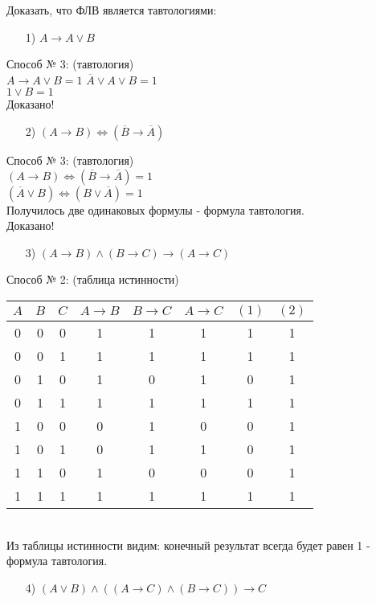 \documentclass{article}
\begin{document}
Доказать, что ФЛВ является тавтологиями:
\begin{enumerate}
\item[1)] $A \rightarrow A \vee B$
\end{enumerate}
Способ № 3: (тавтология)\\
$A \rightarrow A \vee B = 1$
$\overline{A} \vee A \vee B = 1$\\
$1 \vee B = 1$\\
Доказано!
\begin{enumerate}
\item[2)] $(A \rightarrow B) \Longleftrightarrow (\overline{B} \rightarrow \overline{A}) $
\end{enumerate}
Способ № 3: (тавтология)\\
$(A \rightarrow B) \Longleftrightarrow (\overline{B} \rightarrow \overline{A}) = 1$\\
$(\overline{A} \vee B) \Longleftrightarrow (B \vee \overline{A}) = 1$\\
Получилось две одинаковых формулы - формула тавтология.\\
Доказано!
\begin{enumerate}
\item[3)] $(A \rightarrow B) \wedge (B \rightarrow C) \rightarrow (A \rightarrow C)$
\end{enumerate}
Способ № 2: (таблица истинности)\\
\begin{tabular}{ | c | c | c | c | c | c | c| c | } %
$A$ & $B$ & $C$ & $A \rightarrow B$ & $B \rightarrow C$ & $A \rightarrow C$ & $(1)$ & $(2)$\\
\hline
0 & 0 & 0 & 1 & 1 & 1 & 1 & 1\\
0 & 0 & 1 & 1 & 1 & 1 & 1 & 1\\
0 & 1 & 0 & 1 & 0 & 1 & 0 & 1\\
0 & 1 & 1 & 1 & 1 & 1 & 1 & 1\\
1 & 0 & 0 & 0 & 1 & 0 & 0 & 1\\
1 & 0 & 1 & 0 & 1 & 1 & 0 & 1\\
1 & 1 & 0 & 1 & 0 & 0 & 0 & 1\\
1 & 1 & 1 & 1 & 1 & 1 & 1 & 1\\
\hline
\end{tabular} \\
Из таблицы истинности видим: конечный результат всегда будет равен 1 - формула тавтология.
\begin{enumerate}
\item[4)] $(A \vee B) \wedge ((A \rightarrow C) \wedge (B \rightarrow C)) \rightarrow C$
\end{enumerate}
\end{document}
